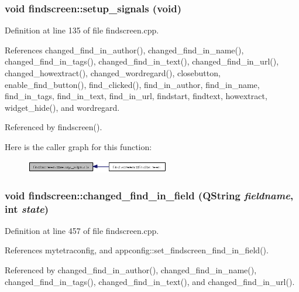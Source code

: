 \subsubsection{\setlength{\rightskip}{0pt plus 5cm}void findscreen::setup\_\-signals (void)\hspace{0.3cm}{\tt  [private]}}\label{classfindscreen_0dfe30d416c78957e826e6ba6ad6e865}




Definition at line 135 of file findscreen.cpp.

References changed\_\-find\_\-in\_\-author(), changed\_\-find\_\-in\_\-name(), changed\_\-find\_\-in\_\-tags(), changed\_\-find\_\-in\_\-text(), changed\_\-find\_\-in\_\-url(), changed\_\-howextract(), changed\_\-wordregard(), closebutton, enable\_\-find\_\-button(), find\_\-clicked(), find\_\-in\_\-author, find\_\-in\_\-name, find\_\-in\_\-tags, find\_\-in\_\-text, find\_\-in\_\-url, findstart, findtext, howextract, widget\_\-hide(), and wordregard.

Referenced by findscreen().

Here is the caller graph for this function:\begin{figure}[H]
\begin{center}
\leavevmode
\includegraphics[width=178pt]{classfindscreen_0dfe30d416c78957e826e6ba6ad6e865_icgraph}
\end{center}
\end{figure}
\subsubsection{\setlength{\rightskip}{0pt plus 5cm}void findscreen::changed\_\-find\_\-in\_\-field (QString {\em fieldname}, int {\em state})\hspace{0.3cm}{\tt  [private]}}\label{classfindscreen_dca80696c1d3b77a0ebe8335157bf6e7}




Definition at line 457 of file findscreen.cpp.

References mytetraconfig, and appconfig::set\_\-findscreen\_\-find\_\-in\_\-field().

Referenced by changed\_\-find\_\-in\_\-author(), changed\_\-find\_\-in\_\-name(), changed\_\-find\_\-in\_\-tags(), changed\_\-find\_\-in\_\-text(), and changed\_\-find\_\-in\_\-url().


